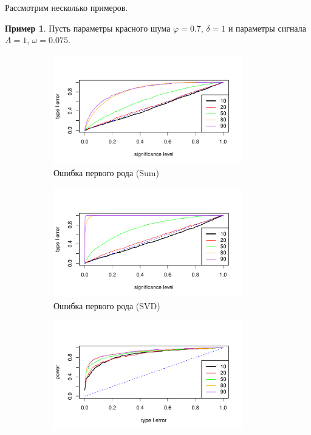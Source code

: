 \documentclass[specialist,
substylefile = spbu_report.rtx,
subf,href,colorlinks=true, 12pt]{disser}
\theoremstyle{definition}
\newtheorem{example}{Пример}
\begin{document}
Рассмотрим несколько примеров.

\begin{example}\label{mc-mssa_example1}
	Пусть параметры красного шума $\varphi=0.7$, $\delta=1$ и параметры сигнала $A=1$, $\omega=0.075$.

\begin{figure}[h!]
	\captionsetup[subfigure]{justification=Centering}
	\begin{subfigure}[t]{0.5\textwidth}
		\centering
		\includegraphics[width=0.9\textwidth]{img/type1error_sum_ev.pdf}
		\caption{Ошибка первого рода (Sum)}
		\label{fig:sum_ev_a}
	\end{subfigure}\hspace{\fill}
	\begin{subfigure}[t]{0.5\textwidth}
		\centering
		\includegraphics[width=0.9\textwidth]{img/type1error_mssa_ev.pdf}
		\caption{Ошибка первого рода (SVD)}
	\end{subfigure}
	\bigskip
	\begin{subfigure}[t]{0.5\textwidth}
		\centering
		\includegraphics[width=0.9\textwidth]{img/roc_sum_ev_omega0075.pdf}

\end{subfigure}
\end{figure}
\end{example}
\end{document}
